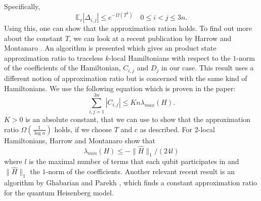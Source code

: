 Specifically, \[
	\mathbb{E}_r\left| \Delta_{i,j} \right|  \le e^{-\Omega(T^2)} \quad 0\le i<j\le 3n
.\]
Using this, one can show that the approximation ration holds.
To find out more about the constant $T$, we can look at a recent publication by Harrow and Montanaro \cite{harrow17}.
An algorithm is presented which gives an product state approximation ratio to traceless $k$-local Hamiltonians with respect to the $1$-norm of the coefficients of the Hamiltonian, $C_{i,j}$ and $D_j$ in our case.
This result uses a different notion of approximation ratio but is concerned with the same kind of Hamiltonians.
We use the following equation which is proven in the paper: \[
	\sum_{i,j=1}^{3n} \left| C_{i,j} \right| \le Kn\lambda_{max}(H)
.\]
$K>0$ is an absolute constant, that we can use to show that the approximation ratio $\Omega(\frac{1}{\log{}n})$ holds, if we choose $T$ and $c$ as described.
For $2$-local Hamiltonians, Harrow and Montanaro show that \[
	\lambda_{min}(H)\le - \|\hat{H}\|_1/(24l)
\]
where $l$ is the maximal number of terms that each qubit participates in and $\|\hat{H}\|_1$ the $1$-norm of the coefficients.
Another relevant recent result is an algorithm by Ghabarian and Parekh \cite{gharibian19}, which finds a constant approximation ratio for the quantum Heisenberg model.
